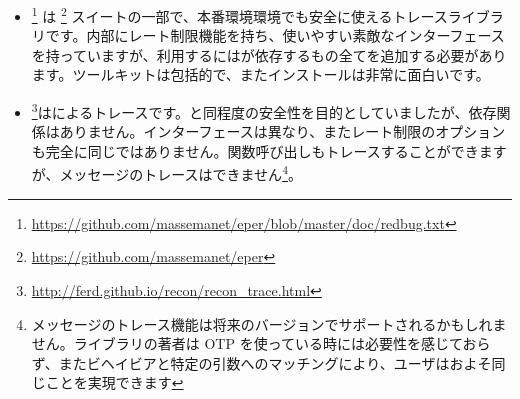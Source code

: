 \begin{itemize}
\item {}\footnote{\href{https://github.com/massemanet/eper/blob/master/doc/redbug.txt}{https://github.com/massemanet/eper/blob/master/doc/redbug.txt}} は \footnote{\href{https://github.com/massemanet/eper}{https://github.com/massemanet/eper}} スイートの一部で、本番環境環境でも安全に使えるトレースライブラリです。内部にレート制限機能を持ち、使いやすい素敵なインターフェースを持っていますが、利用するにはが依存するもの全てを追加する必要があります。ツールキットは包括的で、またインストールは非常に面白いです。

\item {}\footnote{\href{http://ferd.github.io/recon/recon\_trace.html}{http://ferd.github.io/recon/recon\_trace.html}}はによるトレースです。と同程度の安全性を目的としていましたが、依存関係はありません。インターフェースは異なり、またレート制限のオプションも完全に同じではありません。関数呼び出しもトレースすることができますが、メッセージのトレースはできません\footnote{メッセージのトレース機能は将来のバージョンでサポートされるかもしれません。ライブラリの著者は OTP を使っている時には必要性を感じておらず、またビヘイビアと特定の引数へのマッチングにより、ユーザはおよそ同じことを実現できます}。
\end{itemize}

